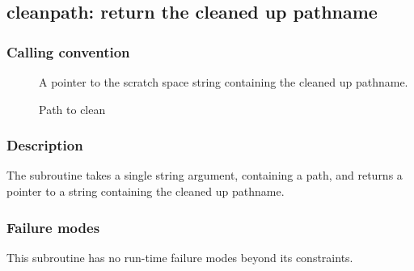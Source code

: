 \clearpage
{}
{}
\label{subr:cleanpath}
\subsection*{cleanpath: return the cleaned up pathname}

\subsubsection*{Calling convention}

\begin{description}
\item[] A pointer to the scratch space string containing the
	cleaned up pathname.
\item[] Path to clean
\end{description}

\subsubsection*{Description}

The  subroutine takes a single string argument, containing
a path, and returns a pointer to a string containing the cleaned up pathname.

\subsubsection*{Failure modes}

This subroutine has no run-time failure modes beyond its constraints.
